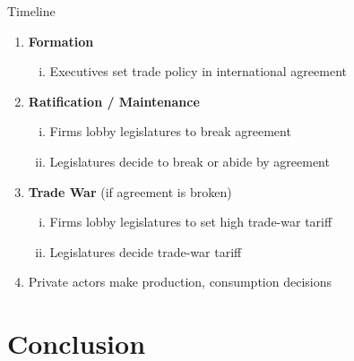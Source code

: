 \documentclass[handout]{beamer}
\newcommand{\ta}{\theta}
\begin{document}




\begin{frame}{Timeline}
\begin{enumerate}
	\item {\color{gray} \textbf{Formation}}
		\begin{enumerate}[i.]
			\item {\color{gray} Executives set trade policy in international agreement}
		\end{enumerate}
	\item \textbf{Ratification / Maintenance}
		\begin{enumerate}[i.]
			\item Firms lobby legislatures to break agreement
			\item {\color{gray} Legislatures decide to break or abide by agreement}
		\end{enumerate}
	\item {\color{gray} \textbf{Trade War} (if agreement is broken)}
		\begin{enumerate}[i.]
			\item {\color{gray} Firms lobby legislatures to set high trade-war tariff}
			\item {\color{gray} Legislatures decide trade-war tariff}
		\end{enumerate}
	\item {\color{gray} Private actors make production, consumption decisions}
\end{enumerate}
\end{frame}




\section{Conclusion}
\end{document}

